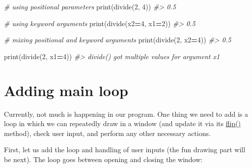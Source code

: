 \documentclass[
]{book}
\newenvironment{Shaded}{\begin{snugshade}}{\end{snugshade}}
\newcommand{\BuiltInTok}[1]{#1}
\newcommand{\CommentTok}[1]{\textcolor[rgb]{0.56,0.35,0.01}{\textit{#1}}}
\newcommand{\DecValTok}[1]{\textcolor[rgb]{0.00,0.00,0.81}{#1}}
\newcommand{\NormalTok}[1]{#1}
\newcommand{\OperatorTok}[1]{\textcolor[rgb]{0.81,0.36,0.00}{\textbf{#1}}}
\begin{document}
\begin{Shaded}
\begin{Highlighting}[]
\CommentTok{\# using positional parameters}
\BuiltInTok{print}\NormalTok{(divide(}\DecValTok{2}\NormalTok{, }\DecValTok{4}\NormalTok{))}
\CommentTok{\#\textgreater{} 0.5}
\end{Highlighting}
\end{Shaded}

\begin{Shaded}
\begin{Highlighting}[]
\CommentTok{\# using keyword arguments}
\BuiltInTok{print}\NormalTok{(divide(x2}\OperatorTok{=}\DecValTok{4}\NormalTok{, x1}\OperatorTok{=}\DecValTok{2}\NormalTok{))}
\CommentTok{\#\textgreater{} 0.5}
\end{Highlighting}
\end{Shaded}

\begin{Shaded}
\begin{Highlighting}[]
\CommentTok{\# mixing positional and keyword arguments}
\BuiltInTok{print}\NormalTok{(divide(}\DecValTok{2}\NormalTok{, x2}\OperatorTok{=}\DecValTok{4}\NormalTok{))}
\CommentTok{\#\textgreater{} 0.5}
\end{Highlighting}
\end{Shaded}

\begin{Shaded}
\begin{Highlighting}[]
\BuiltInTok{print}\NormalTok{(divide(}\DecValTok{2}\NormalTok{, x1}\OperatorTok{=}\DecValTok{4}\NormalTok{))}
\CommentTok{\#\textgreater{} divide() got multiple values for argument \textquotesingle{}x1\textquotesingle{}}
\end{Highlighting}
\end{Shaded}

\hypertarget{adding-main-loop}{%
\section{Adding main loop}\label{adding-main-loop}}

Currently, not much is happening in our program. One thing we need to add is a loop in which we can repeatedly draw in a window (and update it via its \href{https://psychopy.org/api/visual/window.html\#psychopy.visual.Window.flip}{flip()} method), check user input, and perform any other necessary actions.

First, let us add the loop and handling of user inputs (the fun drawing part will be next). The loop goes between opening and closing the window:
\end{document}

